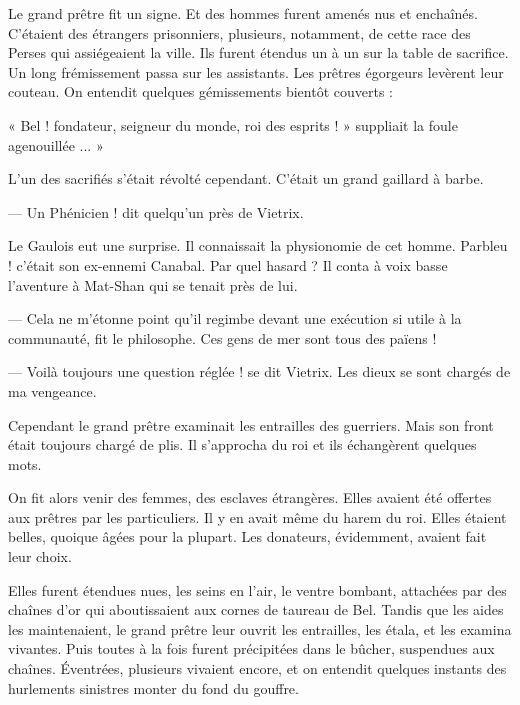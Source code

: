 \documentclass[a4paper, 11pt, oneside, polutonikogreek, french]{article}
\begin{document}
Le grand prêtre fit un signe. Et des hommes furent amenés nus et enchaînés. C'étaient des étrangers prisonniers, plusieurs, notamment, de cette race des Perses qui assiégeaient la ville. Ils furent étendus un à un sur la table de sacrifice. Un long frémissement passa sur les assistants. Les prêtres égorgeurs levèrent leur couteau. On entendit quelques gémissements bientôt couverts :

« Bel ! fondateur, seigneur du monde, roi des esprits ! » suppliait la foule agenouillée ... »

L'un des sacrifiés s'était révolté cependant. C'était un grand gaillard à barbe.

--- Un Phénicien ! dit quelqu'un près de Vietrix.

Le Gaulois eut une surprise. Il connaissait la physionomie de cet homme. Parbleu ! c'était son ex-ennemi Canabal. Par quel hasard ? Il conta à voix basse l'aventure à Mat-Shan qui se tenait près de lui.

--- Cela ne m'étonne point qu'il regimbe devant une exécution si utile à la communauté, fit le philosophe. Ces gens de mer sont tous des païens !

--- Voilà toujours une question réglée ! se dit Vietrix. Les dieux se sont chargés de ma vengeance.

Cependant le grand prêtre examinait les entrailles des guerriers. Mais son front était toujours chargé de plis. Il s'approcha du roi et ils échangèrent quelques mots.

\bigskip
\centerline{\EightStarTaper}
\centerline{\EightStarTaper\EightStarTaper}
\bigskip

On fit alors venir des femmes, des esclaves étrangères. Elles avaient été offertes aux prêtres par les particuliers. Il y en avait même du harem du roi. Elles étaient belles, quoique âgées pour la plupart. Les donateurs, évidemment, avaient fait leur choix.

Elles furent étendues nues, les seins en l'air, le ventre bombant, attachées par des chaînes d'or qui aboutissaient aux cornes de taureau de Bel. Tandis que les aides les maintenaient, le grand prêtre leur ouvrit les entrailles, les étala, et les examina vivantes. Puis toutes à la fois furent précipitées dans le bûcher, suspendues aux chaînes. Éventrées, plusieurs vivaient encore, et on entendit quelques instants des hurlements sinistres monter du fond du gouffre.

\bigskip
\centerline{\EightStarTaper}
\centerline{\EightStarTaper\EightStarTaper}
\bigskip
\end{document}
